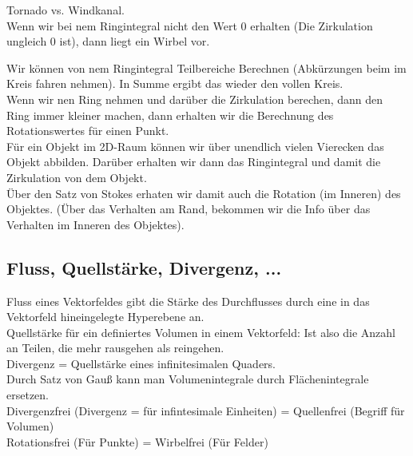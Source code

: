 \documentclass{article}
\begin{document}
Tornado vs. Windkanal.\\

\noindent Wenn wir bei nem Ringintegral nicht den Wert 0 erhalten (Die Zirkulation ungleich 0 ist), dann liegt ein Wirbel vor.


\noindent  Wir können von nem Ringintegral Teilbereiche Berechnen (Abkürzungen beim im Kreis fahren nehmen). In Summe ergibt das wieder den vollen Kreis.\\
 
\noindent  Wenn wir nen Ring nehmen und darüber die Zirkulation berechen, dann den Ring immer kleiner machen, dann erhalten wir die Berechnung des Rotationswertes für einen Punkt.\\
 
\noindent  Für ein Objekt im 2D-Raum können wir über unendlich vielen Vierecken das Objekt abbilden. Darüber erhalten wir dann das Ringintegral und damit die Zirkulation von dem Objekt.\\
 Über den Satz von Stokes erhaten wir damit auch die Rotation (im Inneren) des Objektes. (Über das Verhalten am Rand, bekommen wir die Info über das Verhalten im Inneren des Objektes).\\


\subsection{Fluss, Quellstärke, Divergenz, ...}

Fluss eines Vektorfeldes gibt die Stärke des Durchflusses durch eine in das Vektorfeld hineingelegte Hyperebene an.\\

\noindent Quellstärke für ein definiertes Volumen in einem Vektorfeld: Ist also die Anzahl an Teilen, die mehr rausgehen als reingehen.\\

\noindent Divergenz	= Quellstärke eines infinitesimalen Quaders.\\

\noindent Durch Satz von Gauß kann man Volumenintegrale durch Flächenintegrale ersetzen.\\

\noindent Divergenzfrei (Divergenz = für infintesimale Einheiten) = Quellenfrei (Begriff für Volumen)\\
\noindent Rotationsfrei (Für Punkte) = Wirbelfrei (Für Felder) \\




\pagebreak
\end{document}
